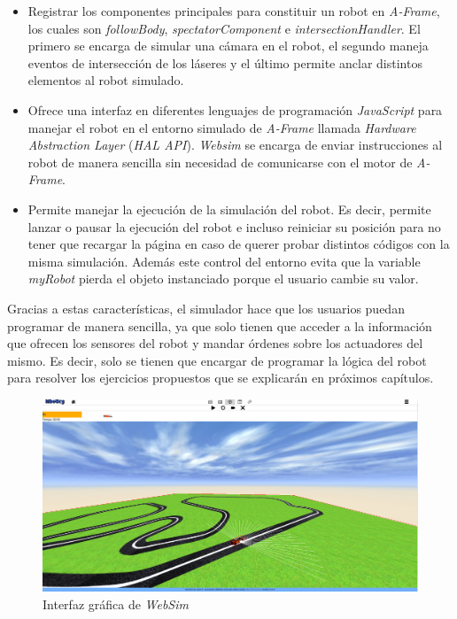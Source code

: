 \begin{itemize}
    \item Registrar los componentes principales para constituir un robot en \textit{A-Frame}, los cuales son \textit{followBody}, \textit{spectatorComponent} e \textit{intersectionHandler}. El primero se encarga de simular una cámara en el robot, el segundo maneja eventos de intersección de los láseres y el último permite anclar distintos elementos al robot simulado. 
    
    \item Ofrece una interfaz en diferentes lenguajes de programación \textit{JavaScript} para manejar el robot en el entorno simulado de \textit{A-Frame} llamada \textit{Hardware Abstraction Layer} (\textit{HAL API}). \textit{Websim} se encarga de enviar instrucciones al robot de manera sencilla sin necesidad de comunicarse con el motor de \textit{A-Frame}. 
    
    
    \item Permite manejar la ejecución de la simulación del robot. Es decir, permite lanzar o pausar la ejecución del robot e incluso reiniciar su posición para no tener que recargar la página en caso de querer probar distintos códigos con la misma simulación. Además este control del entorno evita que la variable \textit{myRobot} pierda el objeto instanciado porque el usuario cambie su valor.
    
\end{itemize}

Gracias a estas características, el simulador hace que los usuarios puedan programar de manera sencilla, ya que solo tienen que acceder a la información que ofrecen los sensores del robot y mandar órdenes sobre los actuadores del mismo. Es decir, solo  se tienen que encargar de programar la lógica del robot para resolver los ejercicios propuestos que se explicarán en próximos capítulos. 


\begin{figure}[H]
    \centering
    \includegraphics[width=1\textwidth]{img/websim.png}
    \caption{Interfaz gráfica de \textit{WebSim}} \label{fig:websim}
\end{figure}




